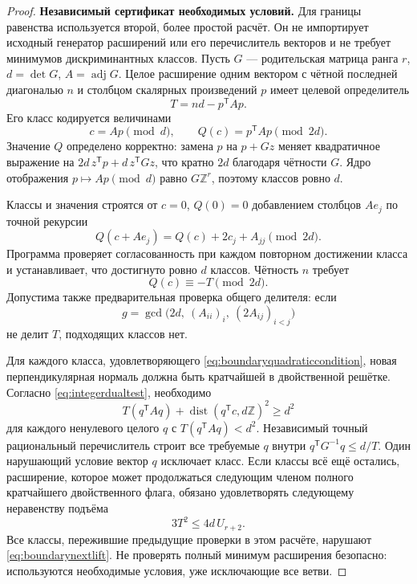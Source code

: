 \documentclass[11pt,a4paper]{article}
\theoremstyle{remark}\newtheorem{remark}[theorem]{Замечание}
\newcommand{\Z}{\mathbb Z}\newcommand{\R}{\mathbb R}\newcommand{\F}{\mathbb F}
\begin{document}
\begin{proof}
\textbf{Независимый сертификат необходимых условий.}
Для границы равенства используется второй, более простой расчёт. Он не импортирует исходный генератор расширений или его перечислитель векторов и не требует минимумов дискриминантных классов. Пусть $G$ --- родительская матрица ранга $r$, $d=\det G$, $A=\operatorname{adj}G$. Целое расширение одним вектором с чётной последней диагональю $n$ и столбцом скалярных произведений $p$ имеет целевой определитель
\[
T=nd-p^{\mathsf T}Ap.
\]
Его класс кодируется величинами
\[
c=Ap\pmod d,\qquad Q(c)=p^{\mathsf T}Ap\pmod{2d}.
\]
Значение $Q$ определено корректно: замена $p$ на $p+Gz$ меняет квадратичное выражение на $2d\,z^{\mathsf T}p+d\,z^{\mathsf T}Gz$, что кратно $2d$ благодаря чётности $G$. Ядро отображения $p\mapsto Ap\pmod d$ равно $G\Z^r$, поэтому классов ровно $d$.

Классы и значения строятся от $c=0$, $Q(0)=0$ добавлением столбцов $Ae_j$ по точной рекурсии
\begin{equation}\label{eq:finitequadraticrecurrence}
Q(c+Ae_j)=Q(c)+2c_j+A_{jj}\pmod{2d}.
\end{equation}
Программа проверяет согласованность при каждом повторном достижении класса и устанавливает, что достигнуто ровно $d$ классов. Чётность $n$ требует
\begin{equation}\label{eq:boundaryquadraticcondition}
Q(c)\equiv-T\pmod{2d}.
\end{equation}
Допустима также предварительная проверка общего делителя: если
\[
g=\gcd\bigl(2d,\ (A_{ii})_i,\ (2A_{ij})_{i<j}\bigr)
\]
не делит $T$, подходящих классов нет.

Для каждого класса, удовлетворяющего \eqref{eq:boundaryquadraticcondition}, новая перпендикулярная нормаль должна быть кратчайшей в двойственной решётке. Согласно \eqref{eq:integerdualtest}, необходимо
\begin{equation}\label{eq:boundarydualcondition}
T(q^{\mathsf T}Aq)+\operatorname{dist}(q^{\mathsf T}c,d\Z)^2\ge d^2
\end{equation}
для каждого ненулевого целого $q$ с $T(q^{\mathsf T}Aq)<d^2$. Независимый точный рациональный перечислитель строит все требуемые $q$ внутри $q^{\mathsf T}G^{-1}q\le d/T$. Один нарушающий условие вектор $q$ исключает класс. Если классы всё ещё остались, расширение, которое может продолжаться следующим членом полного кратчайшего двойственного флага, обязано удовлетворять следующему неравенству подъёма
\begin{equation}\label{eq:boundarynextlift}
3T^2\le4d\,U_{r+2}.
\end{equation}
Все классы, пережившие предыдущие проверки в этом расчёте, нарушают \eqref{eq:boundarynextlift}. Не проверять полный минимум расширения безопасно: используются необходимые условия, уже исключающие все ветви.


\end{proof}
\end{document}
